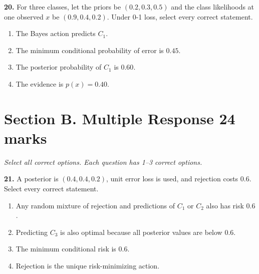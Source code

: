 \documentclass[11pt,a4paper]{article}
\begin{document}
\par\noindent\begin{minipage}{\linewidth}
\textbf{20.} For three classes, let the priors be \((0.2,0.3,0.5)\) and the class likelihoods at one observed \(x\) be \((0.9,0.4,0.2)\). Under 0-1 loss, select every correct statement.
\begin{enumerate}[label=(\Alph*),leftmargin=8mm,itemsep=2pt,topsep=2pt]
\item The Bayes action predicts \(C_1\).
\item The minimum conditional probability of error is \(0.45\).
\item The posterior probability of \(C_1\) is \(0.60\).
\item The evidence is \(p(x)=0.40\).
\end{enumerate}

\end{minipage}\par\vspace{3mm}
\newpage\section*{Section B. Multiple Response \hfill 24 marks}
\textit{Select all correct options. Each question has 1--3 correct options.}\par
\par\noindent\begin{minipage}{\linewidth}
\textbf{21.} A posterior is \((0.4,0.4,0.2)\), unit error loss is used, and rejection costs \(0.6\). Select every correct statement.
\begin{enumerate}[label=(\Alph*),leftmargin=8mm,itemsep=2pt,topsep=2pt]
\item Any random mixture of rejection and predictions of \(C_1\) or \(C_2\) also has risk \(0.6\).
\item Predicting \(C_3\) is also optimal because all posterior values are below \(0.6\).
\item The minimum conditional risk is \(0.6\).
\item Rejection is the unique risk-minimizing action.
\end{enumerate}

\end{minipage}\par\vspace{3mm}
\end{document}
